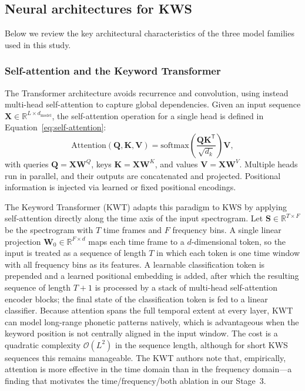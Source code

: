 \documentclass[11pt]{article}
\begin{document}
\subsection{Neural architectures for KWS}
Below we review the key architectural characteristics of the three model families used in this study.

\subsubsection{Self-attention and the Keyword Transformer}
The Transformer architecture \cite{vaswani} avoids recurrence and convolution, using instead multi-head self-attention to capture global dependencies. 
Given an input sequence $\mathbf{X} \in \mathbb{R}^{L \times d_{\text{model}}}$, the self-attention operation for a single head is defined in Equation~\eqref{eq:self-attention}:
\begin{equation}
    \label{eq:self-attention}
    \text{Attention}(\mathbf{Q}, \mathbf{K}, \mathbf{V}) = \text{softmax}\!\left(\frac{\mathbf{Q} \mathbf{K}^{\mathsf{T}}}{\sqrt{d_k}}\right) \mathbf{V},
\end{equation}
with queries $\mathbf{Q} = \mathbf{X} \mathbf{W}^Q$, keys $\mathbf{K} = \mathbf{X} \mathbf{W}^K$, and values $\mathbf{V} = \mathbf{X} \mathbf{W}^V$. 
Multiple heads run in parallel, and their outputs are concatenated and projected. 
Positional information is injected via learned or fixed positional encodings.

The Keyword Transformer (KWT) \cite{kwt} adapts this paradigm to KWS by applying self-attention directly along the time axis of the input spectrogram.
Let $\mathbf{S} \in \mathbb{R}^{T \times F}$ be the spectrogram with $T$ time frames and $F$ frequency bins.
A single linear projection $\mathbf{W}_0 \in \mathbb{R}^{F \times d}$ maps each time frame to a $d$-dimensional token, so the input is treated as a sequence of length $T$ in which each token is one time window with all frequency bins as its features.
A learnable classification token is prepended and a learned positional embedding is added, after which the resulting sequence of length $T+1$ is processed by a stack of multi-head self-attention encoder blocks; the final state of the classification token is fed to a linear classifier.
Because attention spans the full temporal extent at every layer, KWT can model long-range phonetic patterns natively, which is advantageous when the keyword position is not centrally aligned in the input window.
The cost is a quadratic complexity $\mathcal{O}(L^2)$ in the sequence length, although for short KWS sequences this remains manageable.
The KWT authors note that, empirically, attention is more effective in the time domain than in the frequency domain---a finding that motivates the time/frequency/both ablation in our Stage~3.
\end{document}
